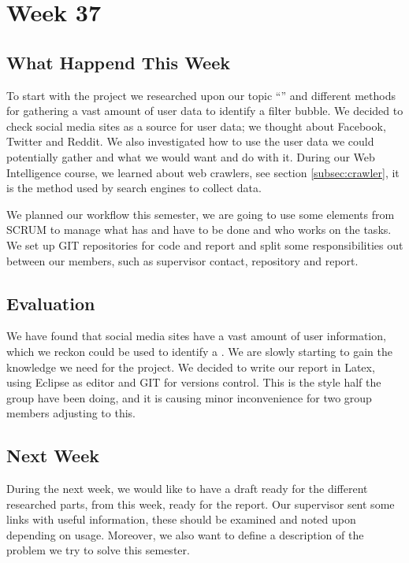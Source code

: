 \section*{Week 37}
\subsection*{What Happend This Week}
To start with the project we researched upon our topic ``\fb'' and different
methods for gathering a vast amount of user data to identify a filter bubble. We
decided to check social media sites as a source for user data; we thought about
Facebook, Twitter and Reddit. We also investigated how to use the user data we
could potentially gather and what we would want and do with it. During our Web
Intelligence course, we learned about web crawlers, see section
\ref{subsec:crawler}, it is the method used by search engines to collect data.

We planned our workflow this semester, we are going to use some elements from
SCRUM to manage what has and have to be done and who works on the tasks. We set
up GIT repositories for code and report and split some responsibilities out
between our members, such as supervisor contact, repository and report.

\subsection*{Evaluation} 
We have found that social media sites have a vast
amount of user information, which we reckon could be used to identify a \fb. We
are slowly starting to gain the knowledge we need for the project. We decided to
write our report in Latex, using Eclipse as editor and GIT for versions control.
This is the style half the group have been doing, and it is causing minor
inconvenience for two group members adjusting to this.

\subsection*{Next Week}
During the next week, we would like to have a draft
ready for the different researched parts, from this week, ready for the report.
Our supervisor sent some links with useful information, these should be examined
and noted upon depending on usage. Moreover, we also want to define a
description of the problem we try to solve this semester.


